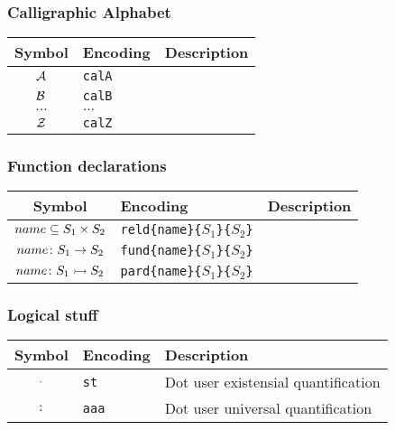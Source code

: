 \documentclass[11pt]{article}
\begin{document}
\subsubsection{Calligraphic Alphabet}

\begin{table}[H]
	\def\arraystretch{1.5}
	\begin{tabular}{c l l}
		\textbf{Symbol} & \textbf{Encoding} & \textbf{Description} \\
		\hline 
		$\mathcal{A}$ & \texttt{calA} &  \\ 
		$\mathcal{B}$ & \texttt{calB} &  \\
		$\ldots$ & $\ldots$ &  \\
		$\mathcal{Z}$ & \texttt{calZ} &  \\
	\end{tabular} 
\end{table}

\subsubsection{Function declarations}

\begin{table}[H]
	\def\arraystretch{1.5}
	\begin{tabular}{c l l}
		\textbf{Symbol} & \textbf{Encoding} & \textbf{Description} \\
		\hline 
		$\mathord{name}\subseteq S_1\times S_2$ & \texttt{reld\{name\}\{$S_1$\}\{$S_2$\}} &  \\ 
		$\mathord{name}\colon S_1\to S_2$ & \texttt{fund\{name\}\{$S_1$\}\{$S_2$\}} &  \\
		$\mathord{name}\colon S_1\rightarrowtail S_2$ & \texttt{pard\{name\}\{$S_1$\}\{$S_2$\}} &  \\
	\end{tabular} 
\end{table}

\subsubsection{Logical stuff}

\begin{table}[H]
	\def\arraystretch{1.5}
	\begin{tabular}{c l l}
		\textbf{Symbol} & \textbf{Encoding} & \textbf{Description} \\
		\hline 
		$\mathrel{.}$ & \texttt{st} & Dot user existensial quantification \\ 
		$\mathrel{:}$ & \texttt{aaa} & Dot user universal quantification \\
	\end{tabular} 
\end{table}
\end{document}
